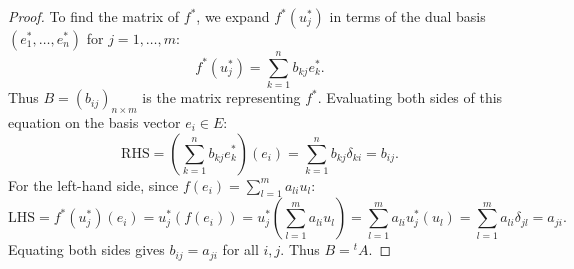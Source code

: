 \documentclass[11pt, a4paper]{article}
\begin{document}
\begin{proof}
  To find the matrix of $f^*$, we expand $f^*(u_j^*)$ in terms of the dual basis $(e_1^*, \dots, e_n^*)$ for $j = 1, \dots, m$:
  \[
    f^*(u_j^*) = \sum_{k=1}^n b_{kj} e_k^*.
  \]
  Thus $B = (b_{ij})_{n \times m}$ is the matrix representing $f^*$. Evaluating both sides of this equation on the basis vector $e_i \in E$:
  \[
    \text{RHS} = \left( \sum_{k=1}^n b_{kj} e_k^* \right)(e_i) = \sum_{k=1}^n b_{kj} \delta_{ki} = b_{ij}.
  \]
  For the left-hand side, since $f(e_i) = \sum_{l=1}^m a_{li} u_l$:
  \[
    \text{LHS} = f^*(u_j^*)(e_i) = u_j^*(f(e_i)) = u_j^*\left( \sum_{l=1}^m a_{li} u_l \right) = \sum_{l=1}^m a_{li} u_j^*(u_l) = \sum_{l=1}^m a_{li} \delta_{jl} = a_{ji}.
  \]
  Equating both sides gives $b_{ij} = a_{ji}$ for all $i, j$. Thus $B = {}^t A$.
\end{proof}
\end{document}
